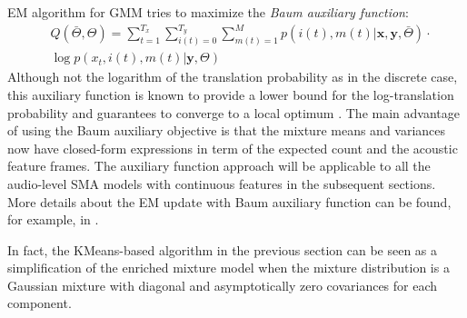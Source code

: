 \documentclass[journal]{IEEEtran}
\begin{document}
EM algorithm for GMM tries to maximize the \textit{Baum auxiliary function}:
\begin{align}\label{eq:multimodal_gmm_objective}
&Q(\bar{\Theta}, \Theta) = \sum_{t=1}^{T_x}\sum_{i(t)=0}^{T_y}\sum_{m(t)=1}^M p(i(t), m(t)|\mathbf x, \mathbf y, \bar {\Theta}) \cdot \nonumber\\
&\log p(x_t, i(t), m(t)| \mathbf y, \Theta)
\end{align}
Although not the logarithm of the translation probability as in the discrete case, this auxiliary function is known to provide a lower bound for the log-translation probability and guarantees to converge to a local optimum \cite{Bilmes1998}. The main advantage of using the Baum auxiliary objective is that the mixture means and variances now have closed-form expressions in term of the expected count and the acoustic feature frames. The auxiliary function approach will be applicable to all the audio-level SMA models with continuous features in the subsequent sections. More details about the EM update with Baum auxiliary function can be found, for example, in \cite{Bilmes1998}. 

In fact, the KMeans-based algorithm in the previous section can be seen as a simplification of the enriched mixture model when the mixture distribution is a Gaussian mixture with diagonal and asymptotically zero covariances for each component. 


\end{document}
